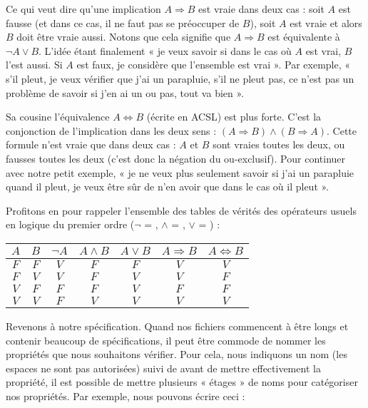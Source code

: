 Ce qui veut dire qu'une implication $A \Rightarrow B$ est vraie dans deux cas :
soit $A$ est fausse (et dans ce cas, il ne faut pas se préoccuper de $B$), soit
$A$ est vraie et alors $B$ doit être vraie aussi. Notons que cela signifie que
$A \Rightarrow B$ est équivalente à $\neg A \vee B$. L'idée étant finalement
« je veux savoir si dans le cas où $A$ est vrai, $B$ l'est aussi. Si $A$ est
faux, je considère que l'ensemble est vrai ». Par exemple, « s'il pleut, je veux
vérifier que j'ai un parapluie, s'il ne pleut pas, ce n'est pas un problème
de savoir si j'en ai un ou pas, tout va bien ».



Sa cousine l'équivalence $A \Leftrightarrow B$ (écrite  en ACSL)
est plus forte. C'est la conjonction de l'implication dans les deux sens :
$(A \Rightarrow B) \wedge (B \Rightarrow A)$. Cette formule n'est vraie que
dans deux cas : $A$ et $B$ sont vraies toutes les deux, ou fausses
toutes les deux (c'est donc la négation du ou-exclusif). Pour continuer avec
notre petit exemple, « je ne veux plus seulement savoir si j'ai un parapluie
quand il pleut, je veux être sûr de n'en avoir que dans le cas où il pleut ».



\begin{Information}
Profitons en pour rappeler l'ensemble des tables de vérités des opérateurs
usuels en logique du premier ordre ($\neg$ = \CodeInline{!}, $\wedge$ = \CodeInline{\&\&},
$\vee$ = \CodeInline{||}) :

\begin{longtabu}{|c|c|c|c|c|c|c|} \hline
$A$ & $B$ & $\neg A$ & $A \wedge B$ & $A \vee B$ & $A \Rightarrow B$ & $A \Leftrightarrow B$ \\ \hline
$F$ & $F$ & $V$ & $F$ & $F$ & $V$ & $V$ \\ \hline
$F$ & $V$ & $V$ & $F$ & $V$ & $V$ & $F$ \\ \hline
$V$ & $F$ & $F$ & $F$ & $V$ & $F$ & $F$ \\ \hline
$V$ & $V$ & $F$ & $V$ & $V$ & $V$ & $V$ \\ \hline
\end{longtabu}
\end{Information}


Revenons à notre spécification. Quand nos fichiers commencent à être longs et
contenir beaucoup de spécifications, il peut être commode de nommer les
propriétés que nous souhaitons vérifier. Pour cela, nous indiquons un nom (les
espaces ne sont pas autorisées) suivi de \CodeInline{:} avant de mettre effectivement
la propriété, il est possible de mettre plusieurs « étages » de noms pour
catégoriser nos propriétés. Par exemple, nous pouvons écrire ceci :



